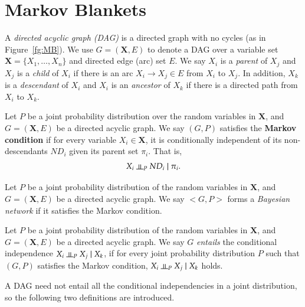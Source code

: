 \documentclass{svmult}
\begin{document}
\section{Markov Blankets} 
\label{sec:mb}

A \textit{directed acyclic graph (DAG)} is a directed graph with no
cycles (as in Figure~\ref{fg:MB}). We use $G=(\mathbf{X},E)$ to denote
a DAG over a variable set $\mathbf{X}=\{X_1, \dots, X_n\}$ and
directed edge (arc) set $E$. We say $X_i$ is a \textit{parent} of
$X_j$ and $X_j$ is a \textit{child} of $X_i$ if there is an arc
$X_i \rightarrow X_j \in E$ from $X_i$ to $X_j$. In addition, $X_k$ is
a \textit{descendant} of $X_i$ and $X_i$ is an \textit{ancestor} of
$X_k$ if there is a directed path from $X_i$ to $X_k$.

\begin{definition}
\label{def:markov}
Let $P$ be a joint probability distribution over the random variables in
$\mathbf{X}$, and $G=(\mathbf{X},E)$ be a directed acyclic graph. We say $(G, P)$
satisfies the \textbf{Markov condition} if for every variable
$X_i \in \mathbf{X}$, it is conditionally independent of its non-descendants
$ND_i$ given its parent set $\pi_i$. That is,
\begin{align*}
X_i \indep_P~ ND_i \mid \pi_i.
\end{align*} 
\end{definition}

\begin{definition}
\label{def:bn}
Let $P$ be a joint probability distribution of the random variables in
$\mathbf{X}$, and $G=(\mathbf{X},E)$ be a directed acyclic graph. We say $<G, P>$ forms
a \textit{Bayesian network} if it satisfies the Markov condition.
\end{definition}

\begin{definition}
\label{def:entail}
Let $P$ be a joint probability distribution of the random variables in
$\mathbf{X}$, and $G=(\mathbf{X},E)$ be a directed acyclic graph. We say $G$
\textit{entails} the conditional independence
$X_i \indep_P~ X_j \mid X_k$, if for every joint
probability distribution $P$ such that $(G, P)$ satisfies the Markov
condition, $X_i \indep_P~ X_j \mid X_k$ holds.
\end{definition}

\noindent
A DAG need not entail all the conditional
independencies in a joint distribution, so the following two
definitions are introduced.
\end{document}
